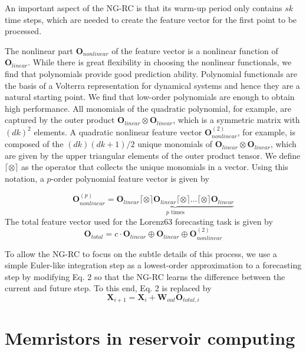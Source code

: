 \documentclass[11pt, oneside]{article}
\begin{document}
An important aspect of the NG-RC is that its warm-up period only contains \(sk\) time steps, which are needed to create the feature vector for the first point to be processed.

The nonlinear part \(\mathbf{O}_{nonlinear}\) of the feature vector is a nonlinear function of \(\mathbf{O}_{linear}\). While there is great flexibility in choosing the nonlinear functionals, we find that polynomials provide good prediction ability. Polynomial functionals are the basis of a Volterra representation for dynamical systems and hence they are a natural starting point. We find that low-order polynomials are enough to obtain high performance.
All monomials of the quadratic polynomial, for example, are captured by the outer product \(\mathbf{O}_{linear} \otimes \mathbf{O}_{linear}\), which is a symmetric
matrix with \((dk)^2\) elements. A quadratic nonlinear feature vector \(\mathbf{O}^{(2)}_{nonlinear}\), for example, is composed of the \((dk)(dk+1)/2\) unique monomials of \(\mathbf{O}_{linear} \otimes \mathbf{O}_{linear}\), which are given by the upper triangular elements of the outer product tensor. We define \(\lceil \otimes \rceil\) as the operator that collects the unique monomials in a vector. Using this notation, a \(p\)-order polynomial feature vector is given by

\begin{equation}
    \mathbf{O}^{(p)}_{nonlinear} =  \underbrace{\mathbf{O}_{linear} \lceil \otimes \rceil \mathbf{O}_{linear} \lceil \otimes \rceil \ldots \lceil \otimes \rceil \mathbf{O}_{linear} }_{p \text{ times}}
\end{equation}
The total feature vector used for the Lorenz63 forecasting task is given by
\begin{equation}
    \mathbf{O}_{total} = c \cdot \mathbf{O}_{linear} \oplus \mathbf{O}_{linear}  \oplus  \mathbf{O}^{(2)}_{nonlinear}
\end{equation}

To allow the NG-RC to focus on the subtle details of this process, we use a simple Euler-like integration step as a lowest-order approximation to a forecasting step by modifying Eq. 2 so that the NG-RC learns the difference between the current and future step. To this end, Eq. 2 is replaced by
\begin{equation}
    \mathbf{X}_{i+1} = \mathbf{X}_i + \mathbf{W}_{out} \mathbf{O}_{total,i}
\end{equation}

\section{Memristors in reservoir computing}
\end{document}

